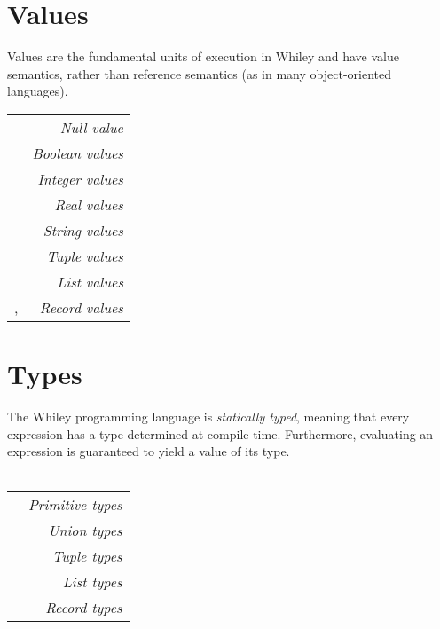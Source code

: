 \documentclass[a4paper,10pt,twcolumn]{article}
\date{}
\newcommand{\token}[1]{\Large\strut\scriptsize\fcolorbox{black}{lightgray}{\strut#1}}
\begin{document}

\section*{Values}
Values are the fundamental units of execution in Whiley and have value semantics, rather than reference semantics (as in many object-oriented languages).

\noindent \begin{tabular}{l r}
\token{\lstinline+null+} & {\em Null value}\\
\token{\lstinline+true+} \token{\lstinline+false+} & {\em Boolean values}\\
\token{\lstinline+123+} \token{\lstinline+-99+} \token{\lstinline+0xFF+} & {\em Integer values}\\
\token{\lstinline+1.23+} \token{\lstinline+-0.02+} & {\em Real values}\\
\token{\lstinline+"Hello"+} \token{\lstinline+"new\n line"+} & {\em String values}\\
\token{\lstinline+(1,2,3)+} \token{\lstinline+(true,null)+} & {\em Tuple values}\\
\token{\lstinline+[]+} \token{\lstinline+[1,2,3]+} \token{\lstinline+[1,"hello",2.0]+} & {\em List values}\\
\token{\lstinline+\{name: "dave"\}+}, \token{\lstinline+\{x: 1, y: 0\}+} & {\em Record values}\\
\end{tabular}
\section*{Types}
The Whiley programming language is {\em statically typed}, meaning that every expression has a type determined at compile time.  Furthermore, evaluating an expression is guaranteed to yield a value of its type.\\\\ 
\begin{tabular}{l r}
\token{\lstinline+null+} \token{\lstinline+bool+} \token{\lstinline+int+} \token{\lstinline+real+} \token{\lstinline+string+} & {\em Primitive types}\\
\token{\lstinline+int|null+} \token{\lstinline+bool|int|real+} & {\em Union types}\\
\token{\lstinline+(int,int)+} \token{\lstinline+(int,null,bool)+} & {\em Tuple types}\\
\token{\lstinline+[int]+} \token{\lstinline+[[bool]]+} \token{\lstinline+[int|null]+} & {\em List types}\\
\token{\lstinline+\{bool f\}+} \token{\lstinline+\{int len, [int] is\}+} & {\em Record types}\\
\end{tabular}
\end{document}
